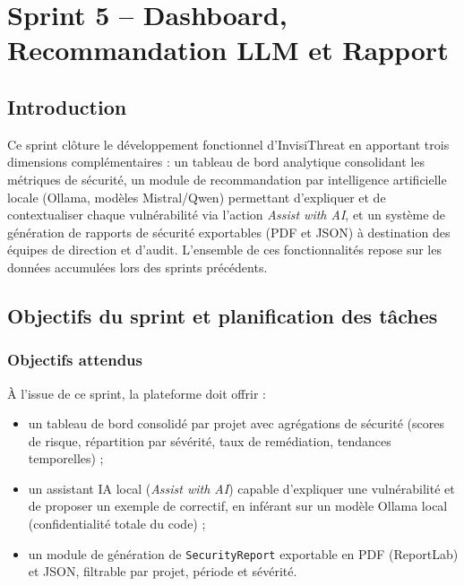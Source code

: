 \chapter{Sprint 5 -- Dashboard, Recommandation LLM et Rapport}

\section{Introduction}
Ce sprint clôture le développement fonctionnel d'InvisiThreat en apportant trois dimensions complémentaires : un tableau de bord analytique consolidant les métriques de sécurité, un module de recommandation par intelligence artificielle locale (Ollama, modèles Mistral/Qwen) permettant d'expliquer et de contextualiser chaque vulnérabilité via l'action \textit{Assist with AI}, et un système de génération de rapports de sécurité exportables (PDF et JSON) à destination des équipes de direction et d'audit. L'ensemble de ces fonctionnalités repose sur les données accumulées lors des sprints précédents.

\section{Objectifs du sprint et planification des tâches}

\subsection{Objectifs attendus}
À l'issue de ce sprint, la plateforme doit offrir :
\begin{itemize}
  \item un tableau de bord consolidé par projet avec agrégations de sécurité (scores de risque, répartition par sévérité, taux de remédiation, tendances temporelles) ;
  \item un assistant IA local (\textit{Assist with AI}) capable d'expliquer une vulnérabilité et de proposer un exemple de correctif, en inférant sur un modèle Ollama local (confidentialité totale du code) ;
  \item un module de génération de \texttt{SecurityReport} exportable en PDF (ReportLab) et JSON, filtrable par projet, période et sévérité.
\end{itemize}

